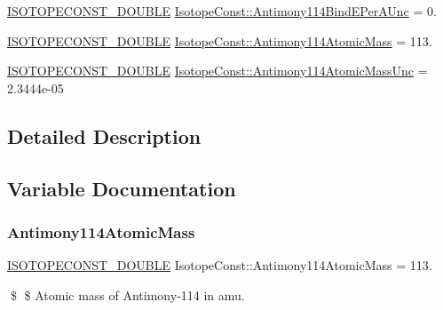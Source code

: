 \begin{DoxyCompactItemize}
\mbox{\hyperlink{group___isotope_const-_macros_ga8f45a7272ce02c0b4c65c44636ed719a}{I\+S\+O\+T\+O\+P\+E\+C\+O\+N\+S\+T\+\_\+\+D\+O\+U\+B\+LE}} \mbox{\hyperlink{group___isotope_const-_antimony-_sb114_ga6d10c8a8ea562839355ec2dd7914fd3a}{Isotope\+Const\+::\+Antimony114\+Bind\+E\+Per\+A\+Unc}} = 0.
\item 
\mbox{\hyperlink{group___isotope_const-_macros_ga8f45a7272ce02c0b4c65c44636ed719a}{I\+S\+O\+T\+O\+P\+E\+C\+O\+N\+S\+T\+\_\+\+D\+O\+U\+B\+LE}} \mbox{\hyperlink{group___isotope_const-_antimony-_sb114_ga5b84912323221addcee076438f894cde}{Isotope\+Const\+::\+Antimony114\+Atomic\+Mass}} = 113.
\item 
\mbox{\hyperlink{group___isotope_const-_macros_ga8f45a7272ce02c0b4c65c44636ed719a}{I\+S\+O\+T\+O\+P\+E\+C\+O\+N\+S\+T\+\_\+\+D\+O\+U\+B\+LE}} \mbox{\hyperlink{group___isotope_const-_antimony-_sb114_ga1642b720100ac42a4af040e3a435e056}{Isotope\+Const\+::\+Antimony114\+Atomic\+Mass\+Unc}} = 2.\+3444e-\/05
\end{DoxyCompactItemize}


\subsection{Detailed Description}


\subsection{Variable Documentation}
\mbox{\label{group___isotope_const-_antimony-_sb114_ga5b84912323221addcee076438f894cde}} 
\subsubsection{\texorpdfstring{Antimony114\+Atomic\+Mass}{Antimony114AtomicMass}}
{\footnotesize\ttfamily \mbox{\hyperlink{group___isotope_const-_macros_ga8f45a7272ce02c0b4c65c44636ed719a}{I\+S\+O\+T\+O\+P\+E\+C\+O\+N\+S\+T\+\_\+\+D\+O\+U\+B\+LE}} Isotope\+Const\+::\+Antimony114\+Atomic\+Mass = 113.}

\$ \$ Atomic mass of Antimony-\/114 in amu. \mbox{\label{group___isotope_const-_antimony-_sb114_ga1642b720100ac42a4af040e3a435e056}} 
